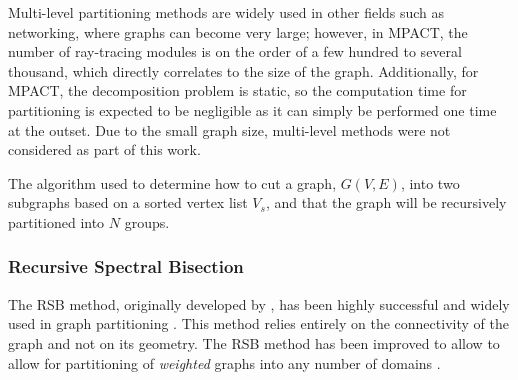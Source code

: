 {{{      Multi-level partitioning methods are widely used in other fields such as networking, where graphs can become very large; however, in MPACT, the number of ray-tracing modules is on the order of a few hundred to several thousand, which directly correlates to the size of the graph.
      Additionally, for MPACT, the decomposition problem is static, so the computation time for partitioning is expected to be negligible as it can simply be performed one time at the outset.
      Due to the small graph size, multi-level methods were not considered as part of this work.

      \begin{algorithm}[ht]
        \centering
        \caption{The algorithm used to determine how to cut a graph, $G(V,E)$, into two subgraphs based on a sorted vertex list $V_s$, and that the graph will be recursively partitioned into $N$ groups.}
        \label{alg:Graph Cutting}
        \begin{algorithmic}[1]
             
             
          \EndProcedure
        \end{algorithmic}
      \end{algorithm}
      \subsubsection{Recursive Spectral Bisection}{\label{sssec:Spatial Decomposition:Recursive Spectral Bisection}
        The \ac{RSB} method, originally developed by \citet{Pothen1989}, has been highly successful and widely used in graph partitioning \cite{Simon1991,Spielman2007}.
        This method relies entirely on the connectivity of the graph and not on its geometry.
        The \ac{RSB} method has been improved to allow to allow for partitioning of \emph{weighted} graphs into any number of domains \cite{Hsieh1995}.

}}}}
